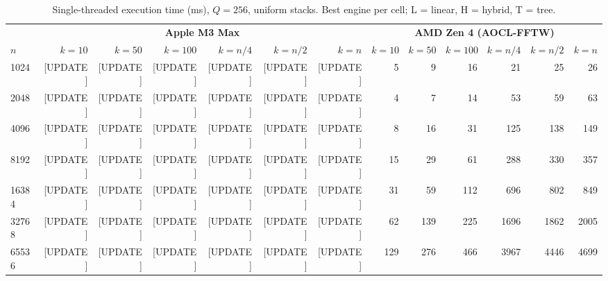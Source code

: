 \documentclass[11pt]{article}
\begin{document}
\begin{table}[t]
\centering
\caption{Single-threaded execution time (ms), $Q = 256$, uniform stacks.
  Best engine per cell; L = linear, H = hybrid, T = tree.}
\label{tab:serial}
\begin{tabular}{@{}l rrrrrr rrrrrr@{}}
\toprule
& \multicolumn{6}{c}{\textbf{Apple M3 Max}} &
  \multicolumn{6}{c}{\textbf{AMD Zen 4 (AOCL-FFTW)}} \\
\cmidrule(lr){2-7} \cmidrule(lr){8-13}
$n$ & $k{=}10$ & $k{=}50$ & $k{=}100$ & $k{=}n/4$ & $k{=}n/2$ & $k{=}n$
    & $k{=}10$ & $k{=}50$ & $k{=}100$ & $k{=}n/4$ & $k{=}n/2$ & $k{=}n$ \\
\midrule
1024  & [UPDATE] & [UPDATE] & [UPDATE] & [UPDATE] & [UPDATE] & [UPDATE]
      & 5 & 9 & 16 & 21 & 25 & 26 \\
2048  & [UPDATE] & [UPDATE] & [UPDATE] & [UPDATE] & [UPDATE] & [UPDATE]
      & 4 & 7 & 14 & 53 & 59 & 63 \\
4096  & [UPDATE] & [UPDATE] & [UPDATE] & [UPDATE] & [UPDATE] & [UPDATE]
      & 8 & 16 & 31 & 125 & 138 & 149 \\
8192  & [UPDATE] & [UPDATE] & [UPDATE] & [UPDATE] & [UPDATE] & [UPDATE]
      & 15 & 29 & 61 & 288 & 330 & 357 \\
16384 & [UPDATE] & [UPDATE] & [UPDATE] & [UPDATE] & [UPDATE] & [UPDATE]
      & 31 & 59 & 112 & 696 & 802 & 849 \\
32768 & [UPDATE] & [UPDATE] & [UPDATE] & [UPDATE] & [UPDATE] & [UPDATE]
      & 62 & 139 & 225 & 1696 & 1862 & 2005 \\
65536 & [UPDATE] & [UPDATE] & [UPDATE] & [UPDATE] & [UPDATE] & [UPDATE]
      & 129 & 276 & 466 & 3967 & 4446 & 4699 \\
\bottomrule
\end{tabular}
\end{table}
\end{document}
